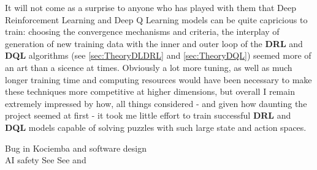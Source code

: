 It will not come as a surprise to anyone who has played with them that Deep Reinforcement Learning and Deep Q Learning models can be quite capricious to train: choosing the convergence mechanisms and criteria, the interplay of generation of new training data with the inner and outer loop of the \textbf{DRL} and \textbf{DQL} algorithms (see \ref{sec:TheoryDLDRL} and \ref{sec:TheoryDQL}) seemed more of an art than a sicence at times. Obviously a lot more tuning, as well as much longer training time and computing resources would have been necessary to make these techniques more competitive at higher dimensions, but overall I remain extremely impressed by how, all things considered - and given how daunting the project seemed at first - it took me little effort to train successful \textbf{DRL} and \textbf{DQL} models capable of solving puzzles with such large state and action spaces.

Bug in Kociemba and software design\\
AI safety 
See \cite{ManyWorlds}
See \cite{https://doi.org/10.1111/1758-5899.12718} and \cite{Bostrom2014}
